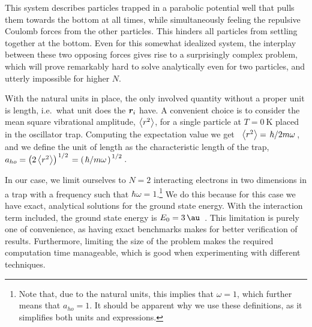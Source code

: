 \documentclass[Thesis.tex]{subfiles}
\begin{document}
This system describes particles trapped in a parabolic potential well that pulls
them towards the bottom at all times, while simultaneously feeling the repulsive
Coulomb forces from the other particles. This hinders all particles from settling together
at the bottom. Even for this somewhat idealized system, the interplay between these two
opposing forces gives rise to a surprisingly complex problem, which will prove remarkably
hard to solve analytically even for two particles, and utterly impossible for higher $N$.

With the natural units in place, the only involved quantity without a proper
unit is length, i.e.\ what unit does the $\bm{r}_i$ have. A convenient
choice is to consider the mean square vibrational amplitude, $\expval{r^2}$, for
a single particle at $T = \SI{0}{\kelvin}$ placed in the oscillator trap.
Computing the expectation value we get~\cite{citation-needed}
$\expval{r^2}=\flatfrac{\hbar}{2m\omega}$, and we define the unit of length as the
characteristic length of the trap, $a_{ho}=\qty(2\expval{r^2})^{\flatfrac{1}{2}}=\qty(\flatfrac{\hbar}{m\omega})^{\flatfrac{1}{2}}$.

In our case, we limit ourselves to $N=2$ interacting electrons in two
dimensions in a trap with a frequency such that $\hbar \omega =
1$.\footnote{Note that, due to the natural units, this implies that $\omega =
  1$, which further means that $a_{ho} = 1$. It should be apparent why we use these
  definitions, as it simplifies both units and expressions.} We do this because for
this case we have exact, analytical solutions for the ground state energy. With the
interaction term included, the ground state energy is $E_0 = \SI{3}{\au}$~\cite{Taut1993}.
This limitation is purely one of convenience, as having exact benchmarks makes for better
verification of results. Furthermore, limiting the size of the problem makes the required
computation time manageable, which is good when experimenting with different techniques.
\end{document}
